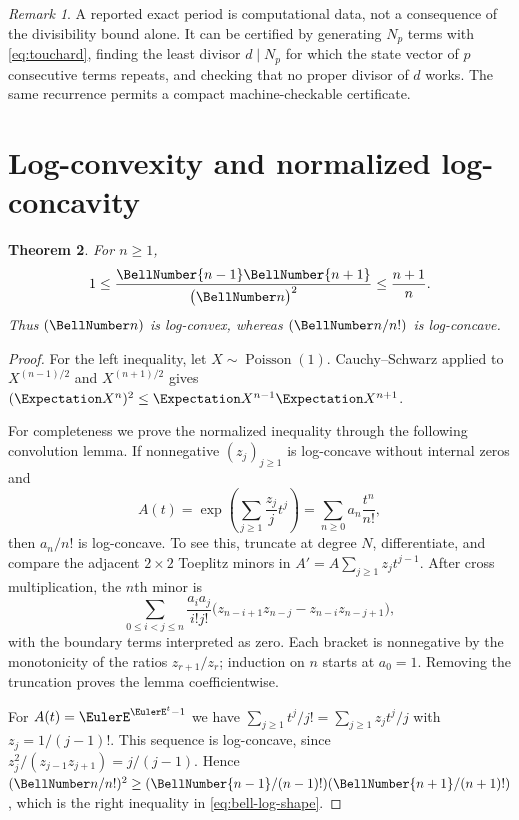 \documentclass[11pt,a4paper,oneside,openany]{book}
\newtheorem{theorem}{Theorem}[chapter]
\theoremstyle{definition}
\theoremstyle{remark}
\newtheorem{remark}[theorem]{Remark}
\begin{document}
\begin{remark}
A reported exact period is computational data, not a consequence of the divisibility
bound alone.  It can be certified by generating $N_p$ terms with
\eqref{eq:touchard}, finding the least divisor $d\mid N_p$ for which the state vector
of $p$ consecutive terms repeats, and checking that no proper divisor of $d$ works.
The same recurrence permits a compact machine-checkable certificate.
\end{remark}

\section{Log-convexity and normalized log-concavity}
\begin{theorem}\label{thm:bell-log-shape}
For $n\ge1$,
\begin{equation}\label{eq:bell-log-shape}
 1\le \frac{\BellNumber{n-1}\BellNumber{n+1}}{\bigl(\BellNumber n\bigr)^2}\le\frac{n+1}{n}.
\end{equation}
Thus $(\BellNumber n)$ is log-convex, whereas $(\BellNumber n/n!)$ is log-concave.
\end{theorem}
\begin{proof}
For the left inequality, let $X\sim\operatorname{Poisson}(1)$.  Cauchy--Schwarz
applied to $X^{(n-1)/2}$ and $X^{(n+1)/2}$ gives
$(\Expectation X^n)^2\le \Expectation X^{n-1}\Expectation X^{n+1}$.

For completeness we prove the normalized inequality through the following
convolution lemma.  If nonnegative $(z_j)_{j\ge1}$ is log-concave without internal
zeros and
\[
 A(t)=\exp\!\left(\sum_{j\ge1}\frac{z_j}{j}t^j\right)
      =\sum_{n\ge0}a_n\frac{t^n}{n!},
\]
then $a_n/n!$ is log-concave.  To see this, truncate at degree $N$, differentiate,
and compare the adjacent $2\times2$ Toeplitz minors in
$A'=A\sum_{j\ge1}z_jt^{j-1}$.  After cross multiplication, the $n$th minor is
\[
 \sum_{0\le i<j\le n}
 \frac{a_i a_j}{i!j!}
 \bigl(z_{n-i+1}z_{n-j}-z_{n-i}z_{n-j+1}\bigr),
\]
with the boundary terms interpreted as zero.  Each bracket is nonnegative by the
monotonicity of the ratios $z_{r+1}/z_r$; induction on $n$ starts at $a_0=1$.
Removing the truncation proves the lemma coefficientwise.

For $A(t)=\EulerE^{\EulerE^t-1}$ we have
$\sum_{j\ge1}t^j/j!=\sum_{j\ge1}z_jt^j/j$ with
$z_j=1/(j-1)!$.  This sequence is log-concave, since
$z_j^2/(z_{j-1}z_{j+1})=j/(j-1)$.  Hence
$(\BellNumber n/n!)^2\ge(\BellNumber{n-1}/(n-1)!)(\BellNumber{n+1}/(n+1)!)$, which is the right
inequality in \eqref{eq:bell-log-shape}.
\end{proof}
\end{document}
